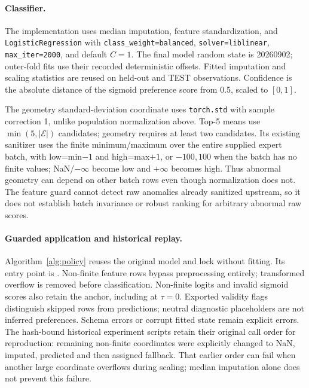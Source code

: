\documentclass[11pt,a4paper]{article}
\begin{document}
\paragraph{Classifier.}
The implementation uses median imputation, feature standardization, and \texttt{LogisticRegression} with \texttt{class\_weight=balanced}, \texttt{solver=liblinear}, \texttt{max\_iter=2000}, and default $C=1$. The final model random state is 20260902; outer-fold fits use their recorded deterministic offsets. Fitted imputation and scaling statistics are reused on held-out and TEST observations. Confidence is the absolute distance of the sigmoid preference score from 0.5, scaled to $[0,1]$.

The geometry standard-deviation coordinate uses \texttt{torch.std} with sample correction 1, unlike population normalization above. Top-5 means use $\min(5,|\mathcal E|)$ candidates; geometry requires at least two candidates. Its existing sanitizer uses the finite minimum/maximum over the entire supplied expert batch, with low=min$-1$ and high=max$+1$, or $-100,100$ when the batch has no finite values; NaN/$-\infty$ become low and $+\infty$ becomes high. Thus abnormal geometry can depend on other batch rows even though normalization does not. The feature guard cannot detect raw anomalies already sanitized upstream, so it does not establish batch invariance or robust ranking for arbitrary abnormal raw scores.

\paragraph{Guarded application and historical replay.}
Algorithm~\ref{alg:policy} reuses the original model and lock without fitting. Its entry point is . Non-finite feature rows bypass preprocessing entirely; transformed overflow is removed before classification. Non-finite logits and invalid sigmoid scores also retain the anchor, including at $\tau=0$. Exported validity flags distinguish skipped rows from predictions; neutral diagnostic placeholders are not inferred preferences. Schema errors or corrupt fitted state remain explicit errors. The hash-bound historical experiment scripts retain their original call order for reproduction: remaining non-finite coordinates were explicitly changed to NaN, imputed, predicted and then assigned fallback. That earlier order can fail when another large coordinate overflows during scaling; median imputation alone does not prevent this failure.
\end{document}
